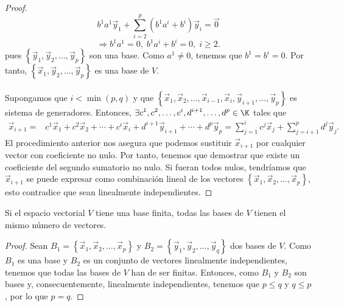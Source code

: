 \begin{proof}
\[ b^{1}a^{1}\vec{y}_{1} + \sum^{p}_{i=2}\left(b^{1}a^{i} + b^{i}\right)\vec{y}_{i} = \vec{0}  \]
\[\Rightarrow b^{1}a^{1} = 0, \; b^{1}a^{i}+b^{i}=0, \; i \geq 2 .\]
pues $\displaystyle \left\{ \vec{y}_{1}, \vec{y}_{2}, \ldots, \vec{y}_{p}\right\} $ son una base. Como $\displaystyle a^{1} \neq 0 $, tenemos que $\displaystyle b^{1}=b^{i} =0 $. Por tanto, $\displaystyle \left\{ \vec{x}_{1}, \vec{y}_{2}, \ldots, \vec{y}_{p}\right\} $ es una base de $\displaystyle V $. \\ \\
Supongamos que $\displaystyle i < \min\left(p,q\right) $ y que $\displaystyle \left\{ \vec{x}_{1}, \vec{x}_{2}, \ldots, \vec{x}_{i-1}, \vec{x}_{i}, \vec{y}_{i+1}, \ldots, \vec{y}_{p}\right\}  $ es sistema de generadores. Entonces, $\displaystyle \exists c^{1}, c^{2}, \ldots, c^{i}, d^{i+1}, \ldots, d^{p} \in \K $ tales que 
\[
\begin{split}
	\vec{x}_{i+ 1} = & c^{1}\vec{x}_{1} + c^{2}\vec{x}_{2} + \cdots + c^{i}\vec{x}_{i} + d^{i+1}\vec{y}_{i+1} + \cdots + d^{p}\vec{y}_{p} = \sum^{i}_{j= 1}c^{j}\vec{x}_{j} + \sum^{p}_{j=i+1}d^{j}\vec{y}_{j}.
\end{split}
\]
El procedimiento anterior nos asegura que podemos sustituir $\displaystyle \vec{x}_{i+1} $ por cualquier vector con coeficiente no nulo. Por tanto, tenemos que demostrar que existe un coeficiente del segundo sumatorio no nulo. Si fueran todos nulos, tendríamos que $\displaystyle \vec{x}_{i+1} $ se puede expresar como combinación lineal de los vectores $\displaystyle \left\{ \vec{x}_{1}, \vec{x}_{2}, \ldots, \vec{x}_{p}\right\} $, esto contradice que sean linealmente independientes. 
\end{proof}

\begin{fcolorary}[]
\normalfont Si el espacio vectorial $\displaystyle V $ tiene una base finita, todas las bases de $\displaystyle V $ tienen el mismo número de vectores.
\end{fcolorary}

\begin{proof}
Sean $\displaystyle B_{1} =\left\{ \vec{x}_{1}, \vec{x}_{2}, \ldots, \vec{x}_{p}\right\} $ y $\displaystyle B_{2}=\left\{ \vec{y}_{1}, \vec{y}_{2}, \ldots, \vec{y}_{q}\right\} $ dos bases de $\displaystyle V $. Como $\displaystyle B_{1} $ es una base y $\displaystyle B_{2} $ es un conjunto de vectores linealmente independientes, tenemos que todas las bases de $\displaystyle V $ han de ser finitas. Entonces, como $\displaystyle B_{1} $ y $\displaystyle B_{2} $ son bases y, consecuentemente, linealmente independientes, tenemos que $\displaystyle p \leq q $ y $\displaystyle q \leq p $, por lo que $\displaystyle p = q $.
\end{proof}

